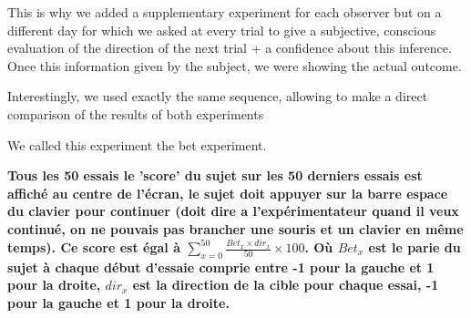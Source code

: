 \documentclass[12pt,english]{article}%
\begin{document}


This is why we added a supplementary experiment for each observer but on a different day for which we asked at every trial to give a subjective, conscious evaluation of the direction of the next trial + a confidence about this inference. Once this information given by the subject, we were showing the actual outcome.

Interestingly, we used exactly the same sequence, allowing to make a direct comparison of the results of both experiments

We called this experiment the bet experiment.


\textbf{Tous les 50 essais le 'score' du sujet sur les 50 derniers essais est affiché au centre de l'écran, le sujet doit appuyer sur la barre espace du clavier pour continuer (doit dire a l'expérimentateur quand il veux continué, on ne pouvais pas brancher une souris et un clavier en même temps). Ce score est égal à $\sum_{x=0}^{50} \frac{Bet_{x} \times dir_x}{50} \times 100$. Où $Bet_x$ est le parie du sujet à chaque début d'essaie comprie entre -1 pour la gauche et 1 pour la droite, $dir_x$ est la direction de la cible pour chaque essai, -1 pour la gauche et 1 pour la droite.}


\end{document}
